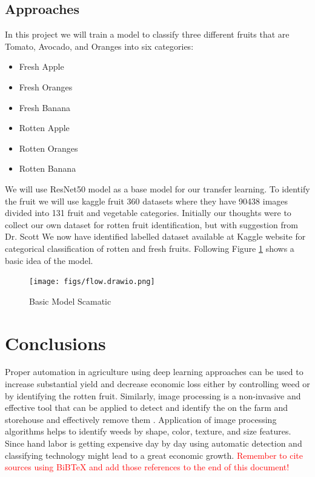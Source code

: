 \documentclass{report}
\begin{document}
 \subsection{Approaches}
 In this project we will train a model to classify three different fruits that are Tomato, Avocado, and Oranges into six categories:
 \begin{itemize}
     \item Fresh Apple
     \item Fresh Oranges
     \item Fresh Banana
     \item Rotten Apple
     \item Rotten Oranges
     \item Rotten Banana
 \end{itemize}
 We will use ResNet50 model as a base model for our transfer learning. To identify the fruit we will use kaggle fruit 360 datasets where they have 90438 images divided into 131 fruit and vegetable categories. Initially our thoughts were to collect our own dataset for rotten fruit identification, but with suggestion from Dr. Scott We now have identified labelled dataset available at Kaggle website for categorical classification of rotten and fresh fruits. Following Figure \ref{fig:pro} shows a basic idea of the model.
\begin{figure}[h]
    \centering
    \texttt{[image: figs/flow.drawio.png]}
    \caption{Basic Model Scamatic}
    \label{fig:pro}
\end{figure}


\section{Conclusions}

Proper automation in agriculture using deep learning approaches can be used to increase substantial yield and decrease economic loss either by controlling weed or by identifying the rotten fruit. Similarly, image processing is a non-invasive and effective tool that can be applied to detect and identify the on the farm and storehouse and effectively remove them . Application of image processing algorithms helps to identify weeds by shape, color, texture, and size features. Since hand labor is getting expensive day by day using automatic detection and classifying technology might lead to a great economic growth. 
\iffalse
\textcolor{red}{Remember to cite sources using BiBTeX and add those references to the end of this document!}
\end{document}

